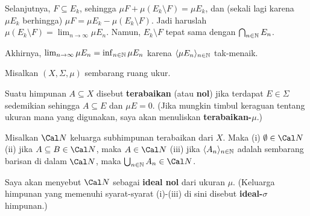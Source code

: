 {

\noindent Selanjutnya, $F\subseteq E_k$, sehingga
$\mu F+\mu(E_k\setminus F)=\mu E_k$, dan (sekali lagi karena
$\mu E_k$ berhingga) $\mu F=\mu E_k-\mu(E_k\setminus F)$. Jadi haruslah
$\mu(E_k\setminus F)=\lim_{n\to\infty}\mu E_n$. Namun,
$E_k\setminus F$ tepat sama dengan $\bigcap_{n\in\Bbb N}E_n$.

Akhirnya, $\lim_{n\to\infty}\mu E_n=\inf_{n\in\Bbb N}\mu E_n$
karena $\langle\mu E_n\rangle_{n\in\Bbb N}$ tak-menaik.
}%

\medskip



 Misalkan $(X,\Sigma,\mu)$ sembarang
ruang ukur.

 Suatu himpunan $A\subseteq X$ disebut
{\bf terabaikan} (atau {\bf nol}) jika terdapat $E\in\Sigma$
sedemikian sehingga $A\subseteq E$ dan $\mu E=0$.
(Jika mungkin timbul keraguan tentang ukuran mana yang digunakan, saya
akan menuliskan {\bf terabaikan-$\mu$}.)

 Misalkan $\Cal N$ keluarga subhimpunan
terabaikan dari $X$. Maka (i) $\emptyset\in\Cal N$ (ii) jika
$A\subseteq B\in\Cal N$, maka $A\in\Cal N$ (iii) jika
$\langle A_n\rangle_{n\in\Bbb N}$ adalah sembarang barisan di dalam
$\Cal N$, maka $\bigcup_{n\in\Bbb N}A_n\in\Cal N$.

Saya akan menyebut $\Cal N$ sebagai {\bf ideal nol} dari ukuran $\mu$.
(Keluarga himpunan yang memenuhi syarat-syarat (i)-(iii) di sini
disebut {\bf ideal-$\sigma$} himpunan.)

